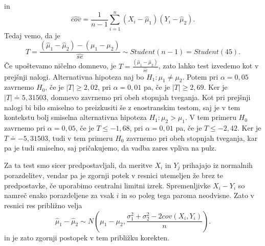 \documentclass[12pt, letterpaper]{article}
\begin{document}
in
\[
\widehat{cov} = \frac{1}{n-1}\sum_{i=1}^n(X_i - \hat{\mu}_1)(Y_i - \hat{\mu}_2).
\]
Tedaj vemo, da je
\[
T = \frac{(\hat{\mu}_1 - \hat{\mu}_2) - (\mu_1 - \mu_2)}{\hat{se}} \sim Student(n-1) = Student(45).
\]
Če upoštevamo ničelno domnevo, je $T = \frac{(\hat{\mu}_1 - \hat{\mu}_2)}{\hat{se}}$, zato lahko test izvedemo kot v prejšnji nalogi. Alternativna hipoteza naj bo $H_1 : \mu_1 \neq \mu_2$. Potem pri $\alpha = 0,05$ zavrnemo $H_0$, če je $|T| \geq 2,02$, pri $\alpha = 0,01$ pa, če je $|T| \geq 2,69$. Ker je $|T| \doteq 5,31503$, domnevo zavrnemo pri obeh stopnjah tveganja. Kot pri prejšnji nalogi bi bilo smiselno to preizkusiti še z enostranskim testom, saj je v tem kontekstu bolj smiselna alternativna hipoteza $H_1 : \mu_2 > \mu_1$. V tem primeru $H_0$ zavrnemo pri $\alpha = 0,05$, če je $T \leq -1,68$, pri $\alpha = 0,01$ pa, če je $T \leq -2,42$. Ker je $T \doteq -5,31503$, tudi v tem primeru $H_0$ zavrnemo pri obeh stopnjah tveganja, kar pa je tudi smiselno, saj pričakujemo, da vadba zares vpliva na pulz.

Za ta test smo sicer predpostavljali, da meritve $X_i$ in $Y_j$ prihajajo iz normalnih porazdelitev, vendar pa je zgornji potek v resnici utemeljen že brez te predpostavke, če uporabimo centralni limitni izrek. Spremenljivke $X_i - Y_i$ so namreč enako porazdeljene za vsak $i$ in so poleg tega paroma neodvisne. Zato v resnici res približno velja
\[
\hat{\mu}_1 - \hat{\mu}_2 \sim N\left(\mu_1 - \mu_2, \frac{\sigma_1^2 + \sigma_2^2 - 2cov(X_i,Y_i)}{n}\right).
\]
in je zato zgornji postopek v tem približku korekten.
\end{document}
